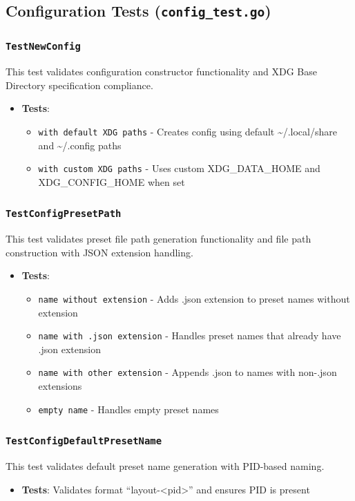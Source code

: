 \subsection{Configuration Tests (\texttt{config\_test.go})}

\subsubsection*{\texttt{TestNewConfig}}
This test validates configuration constructor functionality and XDG Base Directory specification compliance.
\begin{itemize}
    \item \textbf{Tests}:
    \begin{itemize}
        \item \texttt{with default XDG paths} - Creates config using default \textasciitilde/.local/share and \textasciitilde/.config paths
        \item \texttt{with custom XDG paths} - Uses custom XDG\_DATA\_HOME and XDG\_CONFIG\_HOME when set
    \end{itemize}
\end{itemize}

\subsubsection*{\texttt{TestConfigPresetPath}}
This test validates preset file path generation functionality and file path construction with JSON extension handling.
\begin{itemize}
    \item \textbf{Tests}:
    \begin{itemize}
        \item \texttt{name without extension} - Adds .json extension to preset names without extension
        \item \texttt{name with .json extension} - Handles preset names that already have .json extension
        \item \texttt{name with other extension} - Appends .json to names with non-.json extensions
        \item \texttt{empty name} - Handles empty preset names
    \end{itemize}
\end{itemize}

\subsubsection*{\texttt{TestConfigDefaultPresetName}}
This test validates default preset name generation with PID-based naming.
\begin{itemize}
    \item \textbf{Tests}: Validates format ``layout-<pid>'' and ensures PID is present
\end{itemize}
